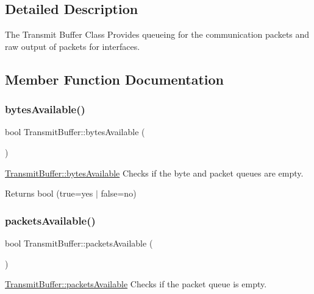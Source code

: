 \subsection{Detailed Description}
The Transmit Buffer Class Provides queueing for the communication packets and raw output of packets for interfaces. 

\subsection{Member Function Documentation}
\hypertarget{class_transmit_buffer_aec08c2e6aa511bfd87d83ec4226b2c8e}{}\label{class_transmit_buffer_aec08c2e6aa511bfd87d83ec4226b2c8e} 
\subsubsection{\texorpdfstring{bytes\+Available()}{bytesAvailable()}}
{\footnotesize\ttfamily bool Transmit\+Buffer\+::bytes\+Available (\begin{DoxyParamCaption}{ }\end{DoxyParamCaption})}



\hyperlink{class_transmit_buffer_aec08c2e6aa511bfd87d83ec4226b2c8e}{Transmit\+Buffer\+::bytes\+Available} Checks if the byte and packet queues are empty. 

\begin{DoxyReturn}{Returns}
bool (true=yes $\vert$ false=no) 
\end{DoxyReturn}
\hypertarget{class_transmit_buffer_aad9976b2ae40b1405a319de979b09827}{}\label{class_transmit_buffer_aad9976b2ae40b1405a319de979b09827} 
\subsubsection{\texorpdfstring{packets\+Available()}{packetsAvailable()}}
{\footnotesize\ttfamily bool Transmit\+Buffer\+::packets\+Available (\begin{DoxyParamCaption}{ }\end{DoxyParamCaption})}



\hyperlink{class_transmit_buffer_aad9976b2ae40b1405a319de979b09827}{Transmit\+Buffer\+::packets\+Available} Checks if the packet queue is empty. 

